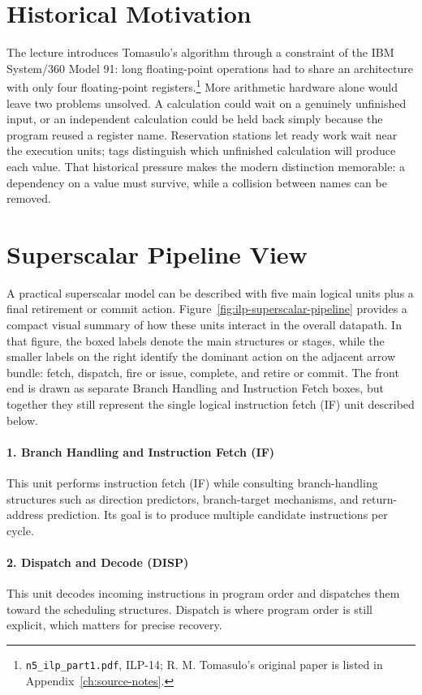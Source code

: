 \section{Historical Motivation}\label{sec:ilp-history}
The lecture introduces Tomasulo's algorithm through a constraint of the IBM System/360 Model 91: long floating-point operations had to share an architecture with only four floating-point registers.\footnote{\texttt{n5\_ilp\_part1.pdf}, ILP-14; R. M. Tomasulo's original paper is listed in Appendix~\ref{ch:source-notes}.}
More arithmetic hardware alone would leave two problems unsolved.
A calculation could wait on a genuinely unfinished input, or an independent calculation could be held back simply because the program reused a register name.
Reservation stations let ready work wait near the execution units; tags distinguish which unfinished calculation will produce each value.
That historical pressure makes the modern distinction memorable: a dependency on a value must survive, while a collision between names can be removed.


\section{Superscalar Pipeline View}\label{sec:ilp-pipeline-model}
A practical superscalar model can be described with five main logical units plus a final retirement or commit action.
Figure~\ref{fig:ilp-superscalar-pipeline} provides a compact visual summary of how these units interact in the overall datapath.
In that figure, the boxed labels denote the main structures or stages, while the smaller labels on the right identify the dominant action on the adjacent arrow bundle: fetch, dispatch, fire or issue, complete, and retire or commit.
The front end is drawn as separate Branch Handling and Instruction Fetch boxes, but together they still represent the single logical instruction fetch (IF) unit described below.

\paragraph{1. Branch Handling and Instruction Fetch (IF)}\label{par:ilp-fetch}
This unit performs instruction fetch (IF) while consulting branch-handling structures such as direction predictors, branch-target mechanisms, and return-address prediction.
Its goal is to produce multiple candidate instructions per cycle.

\paragraph{2. Dispatch and Decode (DISP)}\label{par:ilp-dispatch}
This unit decodes incoming instructions in program order and dispatches them toward the scheduling structures.
Dispatch is where program order is still explicit, which matters for precise recovery.

